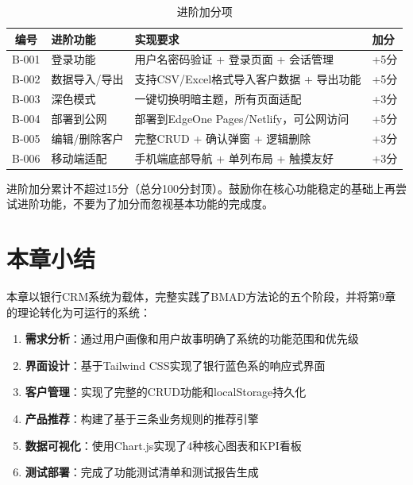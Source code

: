 \begin{table}[H]
\centering
\begin{tabular}{clp{6cm}l}
\toprule
\textbf{编号} & \textbf{进阶功能} & \textbf{实现要求} & \textbf{加分} \\
\midrule
B-001 & 登录功能 & 用户名密码验证 + 登录页面 + 会话管理 & +5分 \\
B-002 & 数据导入/导出 & 支持CSV/Excel格式导入客户数据 + 导出功能 & +5分 \\
B-003 & 深色模式 & 一键切换明暗主题，所有页面适配 & +3分 \\
B-004 & 部署到公网 & 部署到EdgeOne Pages/Netlify，可公网访问 & +5分 \\
B-005 & 编辑/删除客户 & 完整CRUD + 确认弹窗 + 逻辑删除 & +3分 \\
B-006 & 移动端适配 & 手机端底部导航 + 单列布局 + 触摸友好 & +3分 \\
\bottomrule
\end{tabular}
\caption{进阶加分项}
\end{table}

\begin{notebox}[进阶加分上限]
进阶加分累计不超过15分（总分100分封顶）。鼓励你在核心功能稳定的基础上再尝试进阶功能，不要为了加分而忽视基本功能的完成度。
\end{notebox}

\section{本章小结}

本章以银行CRM系统为载体，完整实践了BMAD方法论的五个阶段，并将第9章的理论转化为可运行的系统：

\begin{enumerate}[leftmargin=2em]
  \item \textbf{需求分析}：通过用户画像和用户故事明确了系统的功能范围和优先级
  \item \textbf{界面设计}：基于Tailwind CSS实现了银行蓝色系的响应式界面
  \item \textbf{客户管理}：实现了完整的CRUD功能和localStorage持久化
  \item \textbf{产品推荐}：构建了基于三条业务规则的推荐引擎
  \item \textbf{数据可视化}：使用Chart.js实现了4种核心图表和KPI看板
  \item \textbf{测试部署}：完成了功能测试清单和测试报告生成
\end{enumerate}

